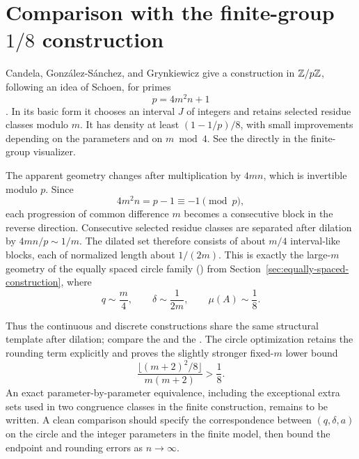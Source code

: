 \section{Comparison with the finite-group \texorpdfstring{$1/8$}{1/8} construction}
\label{sec:construction-comparison}

Candela, Gonz\'alez-S\'anchez, and Grynkiewicz give a construction in
\(\mathbb Z/p\mathbb Z\), following an idea of Schoen, for primes
\[
    p=4m^2n+1
\]
\cite[Lemma~3.1]{CandelaGonzalezSanchezGrynkiewicz2021}.  In its basic form it
chooses an interval \(J\) of integers and retains selected residue classes
modulo \(m\).  It has density at least \((1-1/p)/8\), with small improvements
depending on the parameters and on \(m\bmod4\).
See the  directly in the
finite-group visualizer.

The apparent geometry changes after multiplication by \(4mn\), which is
invertible modulo \(p\).  Since
\[
    4m^2n=p-1\equiv-1\pmod p,
\]
each progression of common difference \(m\) becomes a consecutive block in
the reverse direction.  Consecutive selected residue classes are separated
after dilation by \(4mn/p\sim1/m\).  The dilated set therefore consists of
about \(m/4\) interval-like blocks, each of normalized length about \(1/(2m)\).
This is exactly the large-\(m\) geometry of the equally spaced circle family
() from
Section~\ref{sec:equally-spaced-construction}, where
\[
    q\sim\frac m4,
    \qquad
    \delta\sim\frac1{2m},
    \qquad
    \mu(A)\sim\frac18.
\]

Thus the continuous and discrete constructions share the same structural
template after dilation; compare the
 and the
.  The circle
optimization retains the rounding term
explicitly and proves the slightly stronger fixed-\(m\) lower bound
\[
    \frac{\lfloor(m+2)^2/8\rfloor}{m(m+2)}>\frac18.
\]
An exact parameter-by-parameter equivalence, including the exceptional extra
sets used in two congruence classes in the finite construction, remains to be
written.  A clean comparison should specify the correspondence between
\((q,\delta,a)\) on the circle and the integer parameters in the finite model,
then bound the endpoint and rounding errors as \(n\to\infty\).
